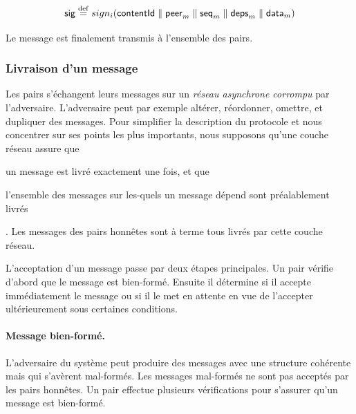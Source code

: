 \begin{equation*}
    \operatorname{\mathsf{sig}} \overset{\mathrm{def}}{=} sign_i(\operatorname{\mathsf{contentId}} \parallel \operatorname{\mathsf{peer}}_m \parallel \operatorname{\mathsf{seq}}_m \parallel \operatorname{\mathsf{deps}}_m \parallel \operatorname{\mathsf{data}}_m)
\end{equation*}

Le message est finalement transmis à l'ensemble des pairs.


\subsubsection{Livraison d'un message}





Les pairs s'échangent leurs messages sur un \emph{réseau asynchrone corrompu} par l'adversaire.
L'adversaire peut par exemple altérer, réordonner, omettre, et dupliquer des messages.
Pour simplifier la description du protocole et nous concentrer sur ses points les plus importants, nous supposons qu'une couche réseau assure que \begin{inlinelist}\item un message est livré exactement une fois, et que \item l'ensemble des messages sur les-quels un message dépend sont préalablement livrés\end{inlinelist}.
Les messages des pairs honnêtes sont à terme tous livrés par cette couche réseau.

L'acceptation d'un message passe par deux étapes principales.
Un pair vérifie d'abord que le message est bien-formé.
Ensuite il détermine si il accepte immédiatement le message ou si il le met en attente en vue de l'accepter ultérieurement sous certaines conditions.


\paragraph{Message bien-formé.} L'adversaire du système peut produire des messages avec une structure cohérente mais qui s'avèrent mal-formés.
Les messages mal-formés ne sont pas acceptés par les pairs honnêtes.
Un pair effectue plusieurs vérifications pour s'assurer qu'un message est bien-formé.


